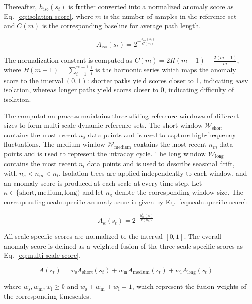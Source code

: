 \documentclass[preprint,12pt,number]{elsarticle}
\begin{document}
Thereafter, \(h_{\mathrm{iso}}(s_t)\) is further converted into a normalized anomaly score as Eq.~\eqref{eq:isolation-score}, where \(m\) is the number of samples in the reference set and \(C(m)\) is the corresponding baseline for average path length.

\[A_{\mathrm{iso}}(s_t) = 2^{-\frac{h_{\mathrm{iso}}(s_t)}{C(m)}} \tag{6}\label{eq:isolation-score}\]

The normalization constant is computed as \(C(m) = 2H(m-1) - \frac{2(m-1)}{m}\), where \(H(m-1)=\sum\limits_{i=1}^{m-1}\frac{1}{i}\) is the harmonic series which maps the anomaly score to the interval \((0,1)\): shorter paths yield scores closer to 1, indicating easy isolation, whereas longer paths yield scores closer to 0, indicating difficulty of isolation.

The computation process maintains three sliding reference windows of different sizes to form multi-scale dynamic reference sets. The short window \(\mathcal{W}_{\mathrm{short}}\) contains the most recent \(n_s\) data points and is used to capture high-frequency fluctuations. The medium window \(\mathcal{W}_{\mathrm{medium}}\) contains the most recent \(n_m\) data points and is used to represent the intraday cycle. The long window \(\mathcal{W}_{\mathrm{long}}\) contains the most recent \(n_l\) data points and is used to describe seasonal drift, with \(n_s < n_m < n_l\). Isolation trees are applied independently to each window, and an anomaly score is produced at each scale at every time step. Let \(\kappa\in\{\mathrm{short},\mathrm{medium},\mathrm{long}\}\) and let \(n_\kappa\) denote the corresponding window size. The corresponding scale-specific anomaly score is given by Eq.~\eqref{eq:scale-specific-score}:

\[A_{\kappa}(s_t)=2^{-\frac{h_{\mathrm{iso}}^{\kappa}(s_t)}{C(n_{\kappa})}} \tag{7}\label{eq:scale-specific-score}\]

All scale-specific scores are normalized to the interval \([0,1]\). The overall anomaly score is defined as a weighted fusion of the three scale-specific scores as Eq.~\eqref{eq:multi-scale-score}.

\[A(s_t)=w_{\mathrm{s}}A_{\mathrm{short}}(s_t)+w_{\mathrm{m}}A_{\mathrm{medium}}(s_t)+w_{\mathrm{l}}A_{\mathrm{long}}(s_t) \tag{8}\label{eq:multi-scale-score}\]

\noindent where \(w_{\mathrm{s}}, w_{\mathrm{m}}, w_{\mathrm{l}} \ge 0\) and \(w_{\mathrm{s}}+w_{\mathrm{m}}+w_{\mathrm{l}}=1\), which represent the fusion weights of the corresponding timescales.
\end{document}
